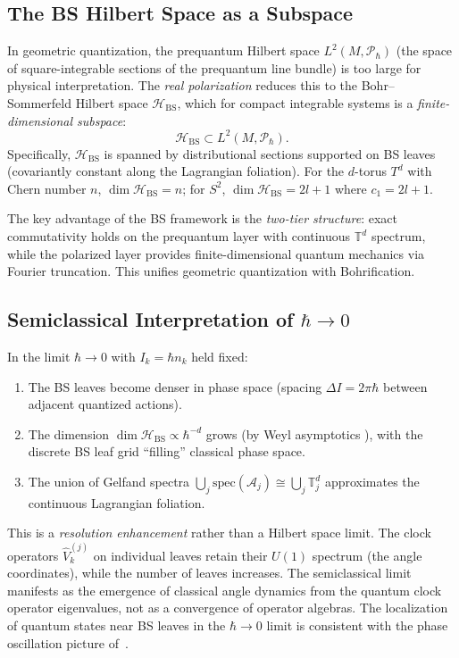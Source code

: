 \documentclass[11pt]{article}
\begin{document}
\subsection{The BS Hilbert Space as a Subspace}

In geometric quantization, the prequantum Hilbert space $L^2(M, \mathcal{P}_\hbar)$
(the space of square-integrable sections of the prequantum line bundle) is too large
for physical interpretation. The \emph{real polarization} reduces this to the
Bohr--Sommerfeld Hilbert space $\mathcal{H}_{\mathrm{BS}}$, which for compact
integrable systems is a \emph{finite-dimensional subspace}:
\[
  \mathcal{H}_{\mathrm{BS}} \subset L^2(M, \mathcal{P}_\hbar).
\]
Specifically, $\mathcal{H}_{\mathrm{BS}}$ is spanned by distributional sections
supported on BS leaves (covariantly constant along the Lagrangian foliation).
For the $d$-torus $T^d$ with Chern number $n$, $\dim \mathcal{H}_{\mathrm{BS}} = n$;
for $S^2$, $\dim \mathcal{H}_{\mathrm{BS}} = 2l+1$ where $c_1 = 2l+1$.

The key advantage of the BS framework is the \emph{two-tier structure}:
exact commutativity holds on the prequantum layer with continuous $\mathbb{T}^d$
spectrum, while the polarized layer provides finite-dimensional quantum mechanics
via Fourier truncation. This unifies geometric quantization with Bohrification.

\subsection{Semiclassical Interpretation of $\hbar \to 0$}

In the limit $\hbar \to 0$ with $I_k = \hbar n_k$ held fixed:
\begin{enumerate}
\item The BS leaves become denser in phase space (spacing $\Delta I = 2\pi\hbar$
between adjacent quantized actions).
\item The dimension $\dim \mathcal{H}_{\mathrm{BS}} \propto \hbar^{-d}$
grows (by Weyl asymptotics \cite{GU89}), with the discrete BS leaf grid
``filling'' classical phase space.
\item The union of Gelfand spectra $\bigcup_j \mathrm{spec}(\mathcal{A}_j) \cong
\bigcup_j \mathbb{T}^d_j$ approximates the continuous Lagrangian foliation.
\end{enumerate}

This is a \emph{resolution enhancement} rather than a Hilbert space limit.
The clock operators $\hat{V}_k^{(j)}$ on individual leaves retain their
$U(1)$ spectrum (the angle coordinates), while the number of leaves increases.
The semiclassical limit manifests as the emergence of classical angle
dynamics from the quantum clock operator eigenvalues, not as a convergence
of operator algebras. The localization of quantum states near BS leaves
in the $\hbar \to 0$ limit is consistent with the phase oscillation
picture of~\cite{LS26}.
\end{document}
